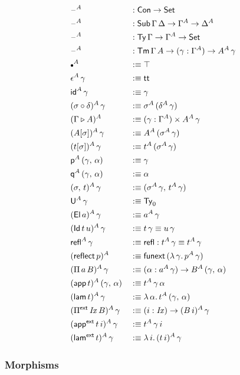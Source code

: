 \documentclass[12pt,a4paper,twoside,openany]{book}
\theoremstyle{remark}
\theoremstyle{definition}
\theoremstyle{theorem}
\newcommand{\mi}[1]{\mathit{#1}}
\newcommand{\ms}[1]{\mathsf{#1}}
\newcommand{\funext}{\ms{funext}}
\newcommand{\refl}{\mathsf{refl}}
\newcommand{\reflect}{\mathsf{reflect}}
\newcommand{\id}{\mathsf{id}}
\newcommand{\Con}{\mathsf{Con}}
\newcommand{\Sub}{\mathsf{Sub}}
\newcommand{\Tm}{\mathsf{Tm}}
\newcommand{\Ty}{\mathsf{Ty}}
\newcommand{\U}{\mathsf{U}}
\newcommand{\El}{\mathsf{El}}
\newcommand{\Id}{\mathsf{Id}}
\renewcommand{\tt}{\mathsf{tt}}
\newcommand{\blank}{\mathord{\hspace{1pt}\text{--}\hspace{1pt}}}
\newcommand{\Set}{\mathsf{Set}}
\newcommand{\ext}{\triangleright}
\newcommand{\emptycon}{\scaleobj{.75}\bullet}
\newcommand{\Pie}{\Pi^{\mathsf{ext}}}
\newcommand{\appe}{\mathsf{app^{ext}}}
\newcommand{\lame}{\mathsf{lam^{ext}}}
\newcommand{\p}{\mathsf{p}}
\newcommand{\q}{\mathsf{q}}
\newcommand{\app}{\ms{app}}
\newcommand{\lam}{\ms{lam}}
\newcommand{\defn}{:\equiv}
\begin{document}
\begin{alignat*}{3}
  &\blank^A &&: \Con \to \Set\\
  &\blank^A &&: \Sub\,\Gamma\,\Delta \to \Gamma^A \to \Delta^A\\
  &\blank^A &&: \Ty\,\Gamma \to \Gamma^A \to \Set\\
  &\blank^A &&: \Tm\,\Gamma\,A \to (\gamma : \Gamma^A) \to A^A\,\gamma\\
  &\emptycon^A &&\defn \top\\
  &\epsilon^A\,\gamma &&\defn \tt\\
  &\id^A\,\gamma &&\defn \gamma\\
  &(\sigma \circ \delta)^A\,\gamma &&\defn \sigma^A\,(\delta^A\,\gamma)\\
  &(\Gamma \ext A)^A &&\defn (\gamma : \Gamma^A) \times A^A\,\gamma\\
  &(A[\sigma])^A\,\gamma &&\defn A^A\,(\sigma^A\,\gamma)\\
  &(t[\sigma])^A\,\gamma &&\defn t^A\,(\sigma^A\,\gamma)\\
  &\p^A\,(\gamma,\,\alpha) &&\defn \gamma\\
  &\q^A\,(\gamma,\,\alpha) &&\defn \alpha\\
  &(\sigma,\,t)^A\,\gamma &&\defn (\sigma^A\,\gamma,\,t^A\,\gamma)\\
  &\U^A\,\gamma &&\defn \Ty_0\\
  &(\El\,a)^A\,\gamma &&\defn a^A\,\gamma\\
  &(\Id\,t\,u)^A\,\gamma &&\defn t\,\gamma \equiv u\,\gamma\\
  &\refl^A\,\gamma &&\defn \refl : t^A\,\gamma \equiv t^A\,\gamma\\
  &(\reflect\,p)^A &&\defn \funext\,(\lambda\,\gamma.\,p^A\,\gamma)\\
  &(\Pi\,a\,B)^A\,\gamma &&\defn (\alpha : a^A\,\gamma) \to B^A\,(\gamma,\,\alpha)\\
  &(\app\,t)^A\,(\gamma,\,\alpha) &&\defn t^A\,\gamma\,\alpha\\
  &(\lam\,t)^A\,\gamma &&\defn \lambda\,\alpha.\,t^A\,(\gamma,\,\alpha)\\
  &(\Pie\,\mi{Ix}\,B)^A\,\gamma &&\defn (i : \mi{Ix}) \to (B\,i)^A\,\gamma\\
  &(\appe\,t\,i)^A\,\gamma &&\defn t^A\,\gamma\,i\\
  &(\lame\,t)^A\,\gamma &&\defn \lambda\,i.\,(t\,i)^A\,\gamma
\end{alignat*}

\subsubsection{Morphisms}
\end{document}
